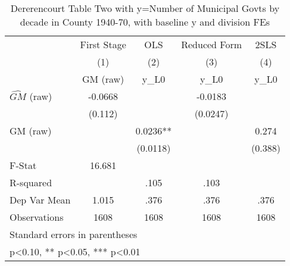 \begin{table}[htbp]\centering
\def\sym#1{\ifmmode^{#1}\else\(^{#1}\)\fi}
\caption{Dererencourt Table Two with y=Number of Municipal Govts by decade in County 1940-70, with baseline y and division FEs}
\begin{tabular}{l*{4}{c}}
\toprule
                    & First Stage   &         OLS   &Reduced Form   &        2SLS   \\
                    &\multicolumn{1}{c}{(1)}&\multicolumn{1}{c}{(2)}&\multicolumn{1}{c}{(3)}&\multicolumn{1}{c}{(4)}\\
                    &\multicolumn{1}{c}{GM  (raw)}&\multicolumn{1}{c}{y\_L0}&\multicolumn{1}{c}{y\_L0}&\multicolumn{1}{c}{y\_L0}\\
\midrule
$\hat{GM}$ (raw)    &     -0.0668   &               &     -0.0183   &               \\
                    &     (0.112)   &               &    (0.0247)   &               \\
\addlinespace
GM  (raw)           &               &      0.0236** &               &       0.274   \\
                    &               &    (0.0118)   &               &     (0.388)   \\
\midrule
F-Stat              &      16.681   &               &               &               \\
R-squared           &               &        .105   &        .103   &               \\
Dep Var Mean        &       1.015   &        .376   &        .376   &        .376   \\
Observations        &        1608   &        1608   &        1608   &        1608   \\
\bottomrule
\multicolumn{5}{l}{\footnotesize Standard errors in parentheses}\\
\multicolumn{5}{l}{\footnotesize * p<0.10, ** p<0.05, *** p<0.01}\\
\end{tabular}
\end{table}
